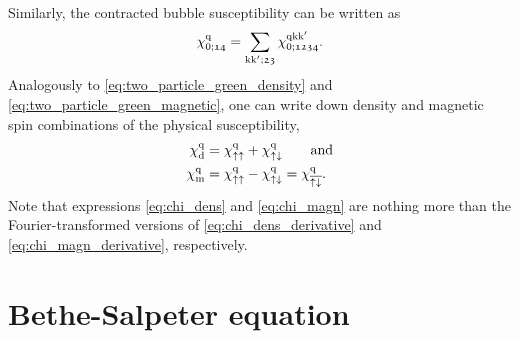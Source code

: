 \documentclass[../../main.tex]{subfiles}
\begin{document}
Similarly, the contracted bubble susceptibility can be written as
\begin{align}
	\chi_{0;\mathfrak{14}}^{\text{q}}=\sum_{\text{k}\text{k}';\mathfrak{23}}\chi_{0;\mathfrak{1234}}^{\text{q}\text{k}\text{k}'}.
\end{align}
Analogously to \eqref{eq:two_particle_green_density} and \eqref{eq:two_particle_green_magnetic}, one can write down density and magnetic spin combinations of the physical susceptibility,
\begin{subequations}
\begin{align}
	\chi_{\text{d}}^{\text{q}}&=\chi_{\uparrow\uparrow}^{\text{q}}+\chi_{\uparrow\downarrow}^{\text{q}}\qquad\text{and}\label{eq:chi_dens}\\
	\chi_{\text{m}}^{\text{q}}&=\chi_{\uparrow\uparrow}^{\text{q}}-\chi_{\uparrow\downarrow}^{\text{q}}=\chi_{\overline{\uparrow\downarrow}}^{\text{q}}.\label{eq:chi_magn}
\end{align}
\end{subequations}
Note that expressions \eqref{eq:chi_dens} and \eqref{eq:chi_magn} are nothing more than the Fourier-transformed versions of \eqref{eq:chi_dens_derivative} and \eqref{eq:chi_magn_derivative}, respectively.

\section{Bethe-Salpeter equation}\label{sec:bethe_salpeter}
\end{document}
